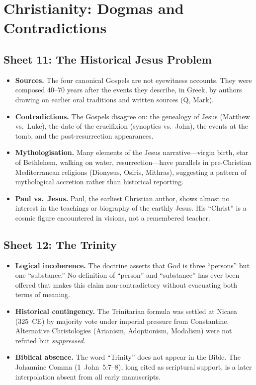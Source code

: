 \section{Christianity: Dogmas and Contradictions}

\subsection{Sheet 11: The Historical Jesus Problem}

\begin{itemize}
  \item \textbf{Sources.}
    The four canonical Gospels are not eyewitness
    accounts.  They were composed 40--70 years after the events they
    describe, in Greek, by authors drawing on earlier oral traditions and
    written sources (Q, Mark).
  \item \textbf{Contradictions.}
    The Gospels disagree on: the genealogy of Jesus (Matthew vs.\ Luke),
    the date of the crucifixion (synoptics vs.\ John), the events at the
    tomb, and the post-resurrection appearances.
  \item \textbf{Mythologisation.}
    Many elements of the Jesus narrative---virgin birth,
    star of Bethlehem, walking on water, resurrection---have parallels in
    pre-Christian Mediterranean religions (Dionysus,
    Osiris, Mithras), suggesting a pattern
    of mythological accretion rather than historical reporting.
  \item \textbf{Paul vs.\ Jesus.}
    Paul, the earliest Christian author, shows almost no interest in the
    teachings or biography of the earthly Jesus.  His ``Christ'' is a cosmic
    figure encountered in visions, not a remembered teacher.
\end{itemize}

\subsection{Sheet 12: The Trinity}

\begin{itemize}
  \item \textbf{Logical incoherence.}
    The doctrine asserts that God is three ``persons'' but one ``substance.''
    No definition of ``person'' and ``substance'' has ever been offered that
    makes this claim non-contradictory without evacuating both terms of
    meaning.
  \item \textbf{Historical contingency.}
    The Trinitarian formula was settled at Nicaea
    (325~CE) by majority vote under imperial pressure from
    Constantine.  Alternative Christologies
    (Arianism, Adoptionism,
    Modalism) were not refuted but \emph{suppressed}.
  \item \textbf{Biblical absence.}
    The word ``Trinity'' does not appear in the Bible.  The Johannine
    Comma (1~John~5:7--8), long cited as scriptural
    support, is a later interpolation absent from all early manuscripts.
\end{itemize}

